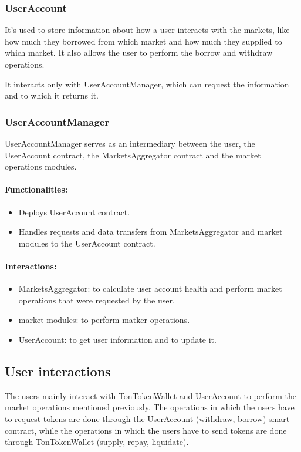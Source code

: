 \subsubsection{UserAccount}

It's used to store information about how a user interacts with the markets, like how much they borrowed from which market and how much they supplied to which market. It also allows the user to perform the borrow and withdraw operations.

It interacts only with UserAccountManager, which can request the information and to which it returns it.

\subsubsection{UserAccountManager}

UserAccountManager serves as an intermediary between the user, the UserAccount contract, the MarketsAggregator contract and the market operations modules. 

\paragraph*{Functionalities:}
\begin{itemize}
  \item Deploys UserAccount contract.
  \item Handles requests and data transfers from MarketsAggregator and market modules to the UserAccount contract.
\end{itemize}

\paragraph*{Interactions:}
\begin{itemize}
  \item MarketsAggregator: to calculate user account health and perform market operations that were requested by the user.
  \item market modules: to perform matker operations.
  \item UserAccount: to get user information and to update it.
\end{itemize}

\subsection{User interactions}

The users mainly interact with TonTokenWallet and UserAccount to perform the market operations mentioned previously. The operations in which the users have to request tokens are done through the UserAccount (withdraw, borrow) smart contract, while the operations in which the users have to send tokens are done through TonTokenWallet (supply, repay, liquidate).

